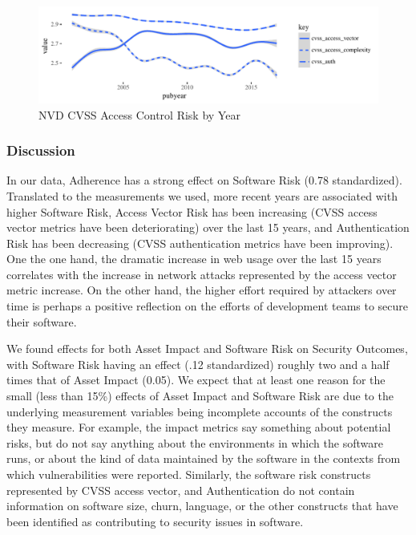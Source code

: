 \begin{figure}
	\centering
	\includegraphics[width=\columnwidth]{nvd_cvss_auth}
	\caption{NVD CVSS Access Control Risk by Year}
	\label{fig:nvd_vulns_auth}
\end{figure}
\subsubsection{Discussion}
\label{sec:case_nvd_discussion}
In our data, Adherence has a strong effect on Software Risk (0.78 standardized). Translated to the measurements we used, more recent years are associated with higher Software Risk, Access Vector Risk has been increasing (CVSS access vector metrics have been deteriorating) over the last 15 years, and Authentication Risk has been decreasing (CVSS authentication metrics have been improving). One the one hand, the dramatic increase in web usage over the last 15 years correlates with the increase in network attacks represented by the access vector metric increase. On the other hand, the higher effort required by attackers over time is perhaps a positive reflection on the efforts of development teams to secure their software.  
 
We found effects for both Asset Impact and Software Risk on Security Outcomes, with Software Risk having an effect (.12 standardized) roughly two and a half times that of Asset Impact (0.05). We expect that at least one reason for the small (less than 15\%) effects of Asset Impact and Software Risk are due to the underlying measurement variables being incomplete accounts of the constructs they measure. For example, the impact metrics say something about potential risks, but do not say anything about the environments in which the software runs, or about the kind of data maintained by the software in the contexts from which vulnerabilities were reported. Similarly, the software risk constructs represented by CVSS access vector, and Authentication do not contain information on software size, churn, language, or the other constructs that have been identified as contributing to security issues in software. 

